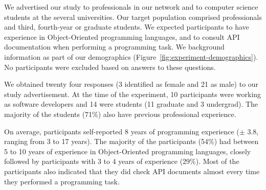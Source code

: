 We advertised our study to professionals in our network and to computer science students at the several universities. 
Our target population comprised professionals and third, fourth-year or graduate students.
We expected participants to have experience in Object-Oriented programming languages, and to consult API documentation when performing a programming task. We background information as part of our demographics (Figure~\ref{fig:experiment-demographics}). No participants were excluded
based on answers to these questions.







We obtained twenty four responses (3 identified as female and 21 as male) to our study advertisement. 
At the time of the experiment, 10 participants were working as software
developers and 14 were students (11 graduate and 3 undergrad).
The majority of the students (71\%) also have previous professional experience.


On average, participants self-reported 8 years of programming experience ({\small $\pm$} 3.8, ranging from 3 to 17 years).
The majority of the participants (54\%) had between 5 to 10 years of experience in Object-Oriented programming languages,
closely followed by participants  with  3 to 4 years of experience (29\%). 
Most of the participants also indicated that they did check API documents almost every time they performed a programming task. 


